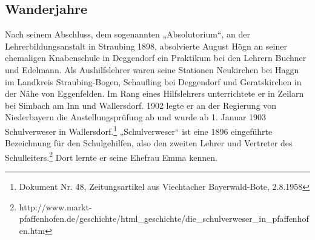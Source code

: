 \documentclass[a4paper]{article}
\begin{document}
\subsection{Wanderjahre}
\hypertarget{RefHeadingToc100333728}{}Nach seinem Abschluss, dem
sogenannten „Absolutorium“, an der Lehrerbildungsanstalt in Straubing
1898, absolvierte August Högn an seiner ehemaligen Knabenschule in
Deggendorf ein Praktikum bei den Lehrern Buchner und Edelmann. Als
Aushilfslehrer waren seine Stationen Neukirchen bei Haggn im Landkreis
Straubing-Bogen, Schaufling bei Deggendorf und Geratskirchen in der
Nähe von Eggenfelden. Im Rang eines Hilfslehrers unterrichtete er in
Zeilarn bei Simbach am Inn und Wallersdorf. 1902 legte er an der
Regierung von Niederbayern die Anstellungsprüfung ab und wurde ab 1.
Januar 1903 Schulverweser in Wallersdorf.\footnote{ Dokument Nr. 48,
Zeitungsartikel aus Viechtacher Bayerwald-Bote, 2.8.1958}
„Schulverweser“ ist eine 1896 eingeführte Bezeichnung für den
Schulgehilfen, also den zweiten Lehrer und Vertreter des
Schulleiters.\footnote{
http://www.markt-pfaffenhofen.de/geschichte/html\_geschichte/die\_schulverweser\_in\_pfaffenhofen.htm}
Dort lernte er seine Ehefrau Emma kennen.
\end{document}
